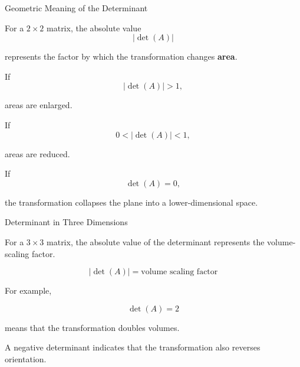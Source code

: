 
\begin{frame}{Geometric Meaning of the Determinant}

For a $2\times2$ matrix, the absolute value
\vspace{-0.1cm}
\[
|\det(A)|
\]

represents the factor by which the transformation changes
\textbf{area}.

If
\vspace{-0.1cm}
\[
|\det(A)|>1,
\]

areas are enlarged.

If
\vspace{-0.1cm}
\[
0<|\det(A)|<1,
\]

areas are reduced.

If
\vspace{-0.1cm}
\[
\boxed{\det(A)=0},
\]

the transformation collapses the plane into a lower-dimensional
space.

\end{frame}



\begin{frame}{Determinant in Three Dimensions}

For a $3\times3$ matrix, the absolute value of the determinant
represents the volume-scaling factor.

\vspace{0.4cm}

\[
\boxed{
|\det(A)|
=
\text{volume scaling factor}
}
\]

For example,

\[
\det(A)=2
\]

means that the transformation doubles volumes.

\vspace{0.4cm}

A negative determinant indicates that the transformation also
reverses orientation.

\end{frame}



